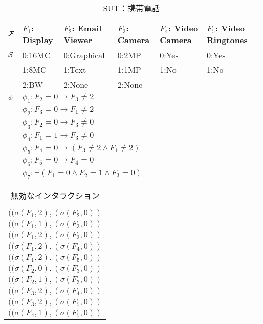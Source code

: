 \documentclass[paper]{ieicej}
\begin{document}
\begin{table}[tb]
	\caption{SUT：携帯電話}
	\label{sut:mobil}
	\begin{center}
		\begin{tabular}{|l|p{1cm}|p{1.35cm}|p{1.1cm}|p{1.15cm}|p{1.15cm}|}
			\hline
			$\cal F$ & $F_1$: Display & $F_2$: Email Viewer & $F_3$: Camera & $F_4$: Video Camera & $F_5$: Video Ringtones\\ \hline
			$\cal S$ & 0:16MC & 0:Graphical & 0:2MP & 0:Yes & 0:Yes \\ 
			& 1:8MC & 1:Text & 1:1MP & 1:No & 1:No \\
			& 2:BW & 2:None & 2:None &   &   \\ \hline
			$\cal \phi$ & \multicolumn{5}{|l|}{$\phi_1: F_2 = 0 \to F_3 \not= 2$}\\
			& \multicolumn{5}{|l|}{$\phi_2: F_3 = 0 \to F_1 \not= 2$}\\
			& \multicolumn{5}{|l|}{$\phi_3: F_2 = 0 \to F_3 \not= 0$}\\
			& \multicolumn{5}{|l|}{$\phi_4: F_1 = 1 \to F_3 \not= 0$}\\
			& \multicolumn{5}{|l|}{$\phi_5: F_4 = 0 \to (F_3 \not= 2 \land F_1 \not= 2)$}\\
			& \multicolumn{5}{|l|}{$\phi_6: F_5 = 0 \to F_4 = 0$}\\
			& \multicolumn{5}{|l|}{$\phi_7: \neg(F_1 = 0 \land F_2 = 1 \land F_3 = 0)$}\\
			\hline
		\end{tabular}
	\end{center}
\end{table}

\begin{table}[tb]
	\caption{無効なインタラクション}
	\label{InvalidInteractions}
	\begin{center}
		\begin{tabular}{|l|}
			\hline
			$((\sigma(F_1, 2), (\sigma(F_2, 0))$ \\
			$((\sigma(F_1, 1), (\sigma(F_3, 0))$ \\
			$((\sigma(F_1, 2), (\sigma(F_3, 0))$ \\
			$((\sigma(F_1, 2), (\sigma(F_4, 0))$ \\
			$((\sigma(F_1, 2), (\sigma(F_5, 0))$ \\
			$((\sigma(F_2, 0), (\sigma(F_3, 0))$ \\
			$((\sigma(F_2, 1), (\sigma(F_3, 0))$ \\
			$((\sigma(F_3, 2), (\sigma(F_4, 0))$ \\
			$((\sigma(F_3, 2), (\sigma(F_5, 0))$ \\
			$((\sigma(F_4, 1), (\sigma(F_5, 0))$ \\  
			\hline
		\end{tabular}
	\end{center}
\end{table}
\end{document}
